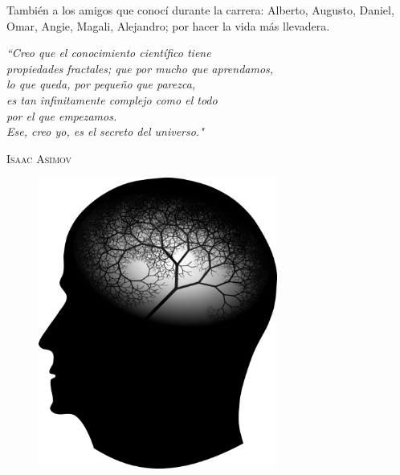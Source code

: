 \documentclass[12pt,letterpaper,draft]{book}
\begin{document}
También a los amigos que conocí durante la carrera: Alberto, Augusto, Daniel, Omar, Angie, Magali, 
Alejandro; por hacer la vida más llevadera.


\thispagestyle{plain}

\tableofcontents
\newpage

\listoffigures
\listoftables
\newpage


\begin{center}\textit{
``Creo que el conocimiento científico tiene \\
propiedades fractales; que por mucho que aprendamos,  \\
lo que queda, por pequeño que parezca,  \\
es tan infinitamente complejo como el todo \\ 
por el que empezamos. \\
Ese, creo yo, es el secreto del universo."} 
\vspace{1em}
\end{center}
\begin{flushright}
\textsc{Isaac Asimov \cite{Asimov}}
\end{flushright}

\begin{figure}
\centering
\includegraphics[width = 0.7\textwidth]{frase.png} 
\end{figure}
\end{document}
